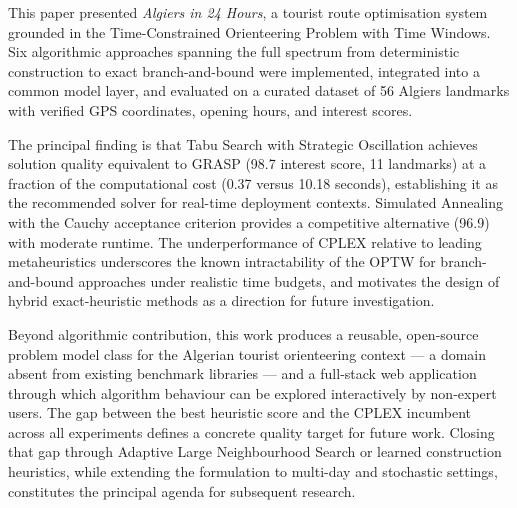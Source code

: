 
This paper presented \textit{Algiers in 24 Hours}, a tourist route
optimisation system grounded in the Time-Constrained Orienteering
Problem with Time Windows. Six algorithmic approaches spanning the
full spectrum from deterministic construction to exact
branch-and-bound were implemented, integrated into a common model
layer, and evaluated on a curated dataset of 56 Algiers landmarks
with verified GPS coordinates, opening hours, and interest scores.

The principal finding is that Tabu Search with Strategic
Oscillation achieves solution quality equivalent to GRASP (98.7
interest score, 11 landmarks) at a fraction of the computational
cost (0.37 versus 10.18 seconds), establishing it as the
recommended solver for real-time deployment contexts. Simulated
Annealing with the Cauchy acceptance criterion provides a
competitive alternative (96.9) with moderate runtime. The
underperformance of CPLEX relative to leading metaheuristics
underscores the known intractability of the OPTW for branch-and-bound
approaches under realistic time budgets, and motivates the design
of hybrid exact-heuristic methods as a direction for future
investigation.

Beyond algorithmic contribution, this work produces a reusable,
open-source problem model class for the Algerian tourist
orienteering context --- a domain absent from existing benchmark
libraries --- and a full-stack web application through which
algorithm behaviour can be explored interactively by non-expert
users. The gap between the best heuristic score and the CPLEX
incumbent across all experiments defines a concrete quality target
for future work. Closing that gap through Adaptive Large
Neighbourhood Search or learned construction heuristics, while
extending the formulation to multi-day and stochastic settings,
constitutes the principal agenda for subsequent research.
